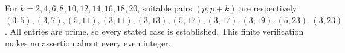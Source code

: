 For $k=2,4,6,8,10,12,14,16,18,20$, suitable pairs $(p,p+k)$ are respectively $(3,5),(3,7),(5,11),(3,11),(3,13),(5,17),(3,17),(3,19),(5,23),(3,23)$. All entries are prime, so every stated case is established. This finite verification makes no assertion about every even integer.
